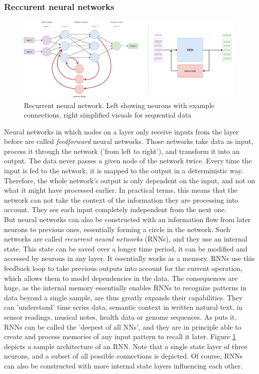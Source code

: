 \documentclass[
a4paper,
pagesize,
pdftex,
12pt,
twoside, %
BCOR=5mm, %
ngerman,
fleqn,
final,
]{scrartcl}
\begin{document}
	\subsubsection{Reccurent neural networks}\label{RNN}
	\begin{figure}[ht]
		\centering
		\includegraphics[width=\linewidth]{img/RecurrentNeuralNetwork}
		\caption{Recurrent neural network. Left showing neurons with example connections, right simplified visuals for sequential data}
		\label{fig:rnn}
	\end{figure}
	Neural networks in which nodes on a layer only receive inputs from the layer before are called \textit{feedforward} neural networks. Those networks take data as input, process it through the network ('from left to right'), and transform it into an output. The data never passes a given node of the network twice. Every time the input is fed to the network, it is mapped to the output in a deterministic way. Therefore, the whole network's output is only dependent on the input, and not on what it might have processed earlier. In practical terms, this means that the network can not take the context of the information they are processing into account. They see each input completely independent from the next one.\\
	But neural networks can also be constructed with an information flow from later neurons to previous ones, essentially forming a circle in the network. Such networks are called \textit{recurrent neural networks} (RNNs), and they use an internal state. This state can be saved over a longer time period, it can be modified and accessed by neurons in any layer. It essentially works as a memory. RNNs use this feedback loop to take previous outputs into account for the current operation, which allows them to model dependencies in the data. The consequences are huge, as the internal memory essentially enables RNNs to recognize patterns in data beyond a single sample, are thus greatly expands their capabilities. They can 'understand' time series data, semantic context in written natural text, in sensor readings, musical notes, health data or genome sequences. As \cite{Schmidhuber.2015} puts it, RNNs can be called the 'deepest of all NNs', and they are in principle able to create and process memories of any input pattern to recall it later. Figure \ref{fig:rnn} depicts a sample architecture of an RNN. Note that a single state layer of three neurons, and a subset of all possible connections is depicted. Of course, RNNs can also be constructed with more internal state layers influencing each other.\\
\end{document}
